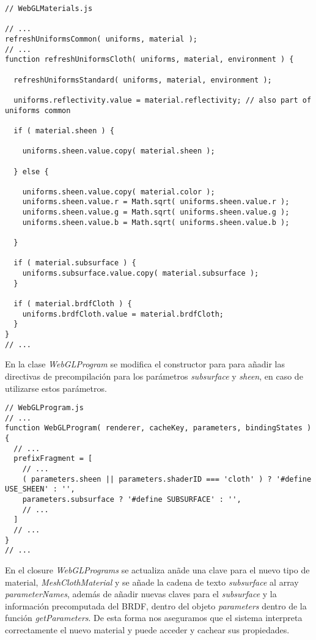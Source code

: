 \singlespacing
\begin{lstlisting}[caption=Cambios sobre la clase WebGLMaterials de ThreeJs]
// WebGLMaterials.js

// ...
refreshUniformsCommon( uniforms, material );
// ...
function refreshUniformsCloth( uniforms, material, environment ) {

  refreshUniformsStandard( uniforms, material, environment );

  uniforms.reflectivity.value = material.reflectivity; // also part of uniforms common

  if ( material.sheen ) {

    uniforms.sheen.value.copy( material.sheen );

  } else {

    uniforms.sheen.value.copy( material.color );
    uniforms.sheen.value.r = Math.sqrt( uniforms.sheen.value.r );
    uniforms.sheen.value.g = Math.sqrt( uniforms.sheen.value.g );
    uniforms.sheen.value.b = Math.sqrt( uniforms.sheen.value.b );

  }

  if ( material.subsurface ) {
    uniforms.subsurface.value.copy( material.subsurface );
  }

  if ( material.brdfCloth ) {
    uniforms.brdfCloth.value = material.brdfCloth;
  }
}
// ...
\end{lstlisting}
\singlespacing

En la clase \textit{WebGLProgram} se modifica el constructor para para a\~nadir las directivas de precompilaci\'on
para los par\'ametros \textit{subsurface} y \textit{sheen}, en caso de utilizarse estos par\'ametros.\\

\begin{lstlisting}[caption=Cambios sobre la clase WebGLProgram de ThreeJs]
// WebGLProgram.js
// ...
function WebGLProgram( renderer, cacheKey, parameters, bindingStates ) {
  // ...
  prefixFragment = [
    // ...
    ( parameters.sheen || parameters.shaderID === 'cloth' ) ? '#define USE_SHEEN' : '',
    parameters.subsurface ? '#define SUBSURFACE' : '',
    // ...
  ]
  // ...
}
// ...
\end{lstlisting}
\singlespacing

En el closure \textit{WebGLPrograms} se actualiza an\~ade una clave para el nuevo tipo de material, \textit{MeshClothMaterial}
y se a\~nade la cadena de texto \textit{subsurface} al array \textit{parameterNames}, adem\'as de a\~nadir nuevas claves para
el \textit{subsurface} y la informaci\'on precomputada del BRDF, dentro del objeto \textit{parameters} dentro de la funci\'on
\textit{getParameters}. De esta forma nos aseguramos que el sistema interpreta correctamente el nuevo material y puede acceder
y cachear sus propiedades.

